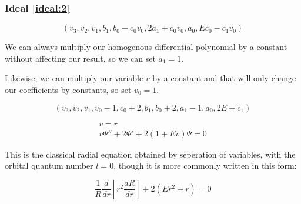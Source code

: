 \documentclass{beamer}
\begin{document}
\begin{frame}
\frametitle{Ideal \eqref{ideal:2}}
\[ \left(v_{3}, v_{2}, v_{1}, b_{1}, b_{0} - c_{0} v_{0}, 2 a_{1} + c_{0} v_{0}, a_{0}, E c_{0} - c_{1} v_{0}\right) \]


We can always multiply our homogenous differential polynomial by a constant without affecting our result, so we can set $a_1=1$.

Likewise, we can multiply our variable $v$ by a constant and that will only change our coefficients by constants,
so set $v_0=1$.

\begin{equation*}
\left(v_{3}, v_{2}, v_{1}, v_{0} - 1, c_{0} + 2, b_{1}, b_{0} + 2, a_{1} - 1, a_{0}, 2 E + c_{1}\right)
\end{equation*}

\begin{equation*}
\label{classical eq in ideal}
\begin{gathered}
v=r \\
v \Psi'' + 2 \Psi' + 2(1 + E v) \Psi = 0
\end{gathered}
\end{equation*}

This is the classical radial equation obtained by seperation of variables,
with the orbital quantum number $l=0$,
though it is more commonly written in this form:

\begin{equation*}
\frac{1}{R} \frac{d}{dr}\left[ r^2 \frac{dR}{dr}\right] + 2(Er^2 + r) = 0
\end{equation*}
\end{frame}
\end{document}
